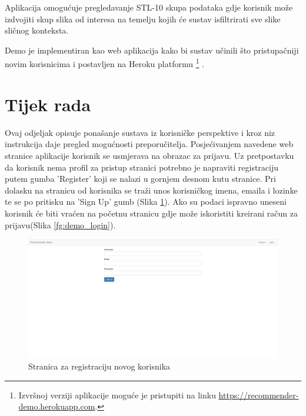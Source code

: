 \documentclass[times, utf8, proizvoljni, numeric]{fer}
\begin{document}
Aplikacija omogućuje pregledavanje STL-10 skupa podataka gdje korisnik može izdvojiti skup slika od interesa na temelju kojih će sustav isfiltrirati sve slike sličnog konteksta.

Demo je implementiran kao web aplikacija kako bi sustav učinili što pristupačniji novim korisnicima i postavljen na Heroku platformu \footnote{Izvršnoj verziji aplikacije moguće je pristupiti na linku \url{https://recommender-demo.herokuapp.com}.} .


\section{Tijek rada}

Ovaj odjeljak opisuje ponašanje sustava iz korisničke perspektive i kroz niz instrukcija daje pregled mogućnosti preporučitelja. Posjećivanjem navedene web stranice aplikacije korisnik se usmjerava na obrazac za prijavu. Uz pretpostavku da korisnik nema profil za pristup stranici potrebno je napraviti registraciju putem gumba 'Register' koji se nalazi u gornjem desnom kutu stranice. Pri dolasku na stranicu od korisnika se traži unos korisničkog imena, emaila i lozinke te se po pritisku na 'Sign Up' gumb (Slika \ref{fg:demo_register}). Ako su podaci ispravno uneseni korisnik će biti vraćen na početnu stranicu gdje može iskoristiti kreirani račun za prijavu(Slika \ref{fg:demo_login}). 
 
\begin{figure}[!ht]
	\begin{center}
		\captionsetup{justification=centering}
		\includegraphics[width=1.0\textwidth]{./imgs/demo-preporucitelja-po-sadrzaju/tijek-rada/demo-regi.png}
		\caption{Stranica za registraciju novog korisnika}
		\label{fg:demo_register}
	\end{center}
\end{figure}
\end{document}
